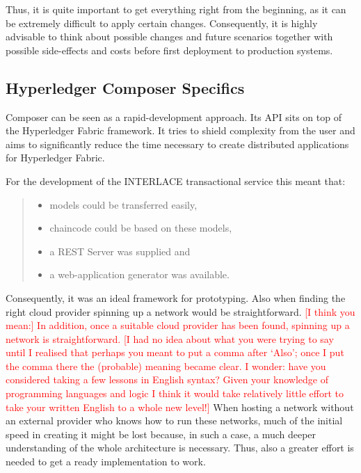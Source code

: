Thus, it is quite important to get everything right from the beginning, as it can be extremely difficult to apply certain changes. Consequently, it is highly advisable to think about possible changes and future scenarios together with possible side-effects and costs before first deployment to production systems.

\subsection{Hyperledger Composer Specifics}

Composer can be seen as a rapid-development approach. Its API sits on top of the Hyperledger Fabric framework. It tries to shield complexity from the user and aims to significantly reduce the time necessary to create distributed applications for Hyperledger Fabric.

For the development of the INTERLACE transactional service this meant that:
\begin{quote}
\begin{itemize}
	\item models could be transferred easily,
	\item chaincode could be based on these models,
	\item a REST Server was supplied and
	\item a web-application generator was available.
\end{itemize}
\end{quote}

Consequently, it was an ideal framework for prototyping. Also when finding the right cloud provider spinning up a network would be straightforward. \textcolor{red}{[I think you mean:] In addition, once a suitable cloud provider has been found, spinning up a network is straightforward. [I had no idea about what you were trying to say until I realised that perhaps you meant to put a comma after `Also'; once I put the comma there the (probable) meaning became clear. I wonder: have you considered taking a few lessons in English syntax? Given your knowledge of programming languages and logic I think it would take relatively little effort to take your written English to a whole new level!]} When hosting a network without an external provider who knows how to run these networks, much of the initial speed in creating it might be lost because, in such a case, a much deeper understanding of the whole architecture is necessary. Thus, also a greater effort is needed to get a ready implementation to work.

